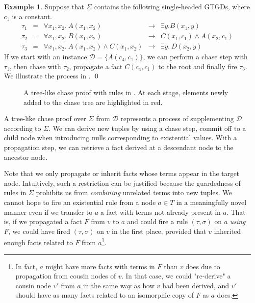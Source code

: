 \documentclass[12pt]{report}
\theoremstyle{plain}
\theoremstyle{definition}
\newtheorem{example}[theorem]{Example}
\begin{document}
\begin{example}
\label{tree-like-chase-proof-example}
  Suppose that $\Sigma$ contains the following single-headed GTGDs, where $c_1$ is a constant.
  \[\begin{array}{rcrcl}
    \tau_1 &=& \forall x_1,x_2.\ A(x_1, x_2) &\rightarrow& \exists y. B(x_1, y) \\
    \tau_2 &=& \forall x_1,x_2.\ B(x_1, x_2) &\rightarrow& C(x_1, c_1) \wedge A(x_2, c_1) \\
    \tau_3 &=& \forall x_1,x_2.\ A(x_1, x_2) \wedge C(x_1, x_2) &\rightarrow& \exists y.\ D(x_2, y)
  \end{array}\]
  If we start with an instance $\mathcal{D} = \{A(c_4, c_1)\}$, we can perform a chase step with $\tau_1$, then chase with $\tau_2$, propagate a fact $C(c_4, c_1)$ to the root and finally fire $\tau_3$. We illustrate the process in .
  \qed
\end{example}

\begin{figure}[t]
  \centering
  
  \caption{A tree-like chase proof with rules in . At each stage, elements newly added to the chase tree are highlighted in red.}
  \label{tree-like-chase-proof-example-diagram}
\end{figure}

A tree-like chase proof over $\Sigma$ from $\mathcal{D}$ represents a process of supplementing $\mathcal{D}$ according to $\Sigma$. We can derive new tuples by using a chase step, commit off to a child node when introducing nulls corresponding to existential values. With a propagation step, we can retrieve a fact derived at a descendant node to the ancestor node.

Note that we only propagate or inherit facts whose terms appear in the target node. Intuitively, such a restriction can be justified because the guardedness of rules in $\Sigma$ prohibits us from \emph{combining} unrelated terms into new tuples. We cannot hope to fire an existential rule from a node $a \in T$ in a meaningfully novel manner even if we transfer to $a$ a fact with terms not already present in $a$. That is, if we propagated a fact $F$ from $v$ to $a$ and could fire a rule $(\tau, \sigma)$ on $a$ \emph{using} $F$, we could have fired $(\tau, \sigma)$ on $v$ in the first place, provided that $v$ inherited enough facts related to $F$ from $a$\footnote{In fact, $a$ might have more facts with terms in $F$ than $v$ does due to propagation from cousin nodes of $v$. In that case, we could "re-derive" a cousin node $v'$ from $a$ in the same way as how $v$ had been derived, and $v'$ should have as many facts related to an isomorphic copy of $F$ as $a$ does.}.
\end{document}
